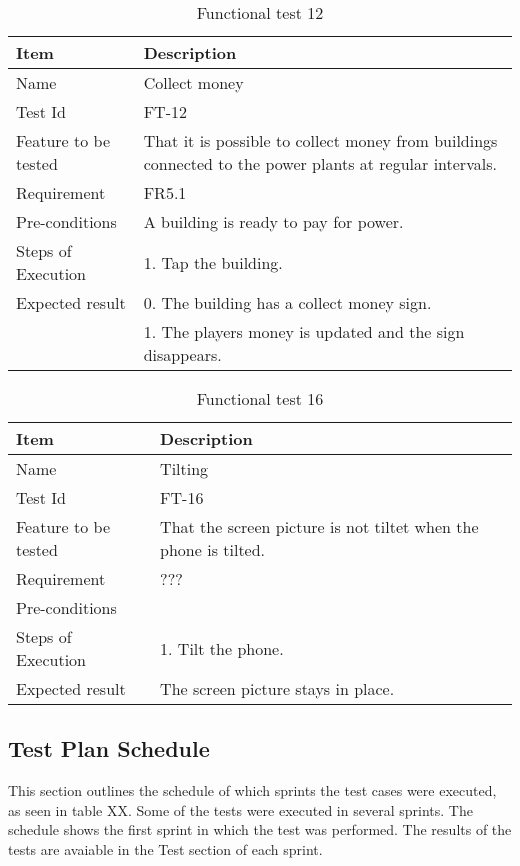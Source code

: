 \begin{table}[H]
\centering
	\begin{tabular}{ l | p{8cm} }
		\hline
		{\bf Item} & {\bf Description} \\ \hline
		Name & Collect money \\ 
		Test Id & FT-12 \\ 
		Feature to be tested & That it is possible to collect money from buildings connected to the power plants at regular intervals. \\
		Requirement & FR5.1 \\ 
		Pre-conditions & A building is ready to pay for power. \\ 
		Steps of Execution & 1. Tap the building. \\ 
		Expected result & 0. The building has a collect money sign. \\
		& 1. The players money is updated and the sign disappears. \\
	\end{tabular}
	\caption{Functional test 12}
\end{table}

\begin{table}[H]
\centering
	\begin{tabular}{ l | p{8cm} }
		\hline
		{\bf Item} & {\bf Description} \\ \hline
		Name & Tilting \\ 
		Test Id & FT-16 \\ 
		Feature to be tested & That the screen picture is not tiltet when the phone is tilted. \\ 
		Requirement & ??? \\ 
		Pre-conditions & \\ 
		Steps of Execution & 1. Tilt the phone. \\ 
		Expected result & The screen picture stays in place. \\ 
	\end{tabular}
	\caption{Functional test 16}
\end{table}

\subsection{Test Plan Schedule}

This section outlines the schedule of which sprints the test cases were executed, as seen in table XX. Some of the tests were executed in several sprints. The schedule shows the first sprint in which the test was performed. The results of the tests are avaiable in the Test section of each sprint.

